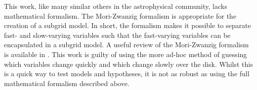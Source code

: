 This work, like many similar others in the astrophysical community, lacks mathematical formalism.
The Mori-Zwanzig formalism \citep{ zwanzig_memory_1961, zwanzig_nonequilibrium_2001} is appropriate for the creation of a subgrid model.
In short, the formalism makes it possible to separate fast- and slow-varying variables such that the fast-varying variables can be encapsulated in a subgrid model.
A useful review of the Mori-Zwanzig formalism is available in \citet{xing_mori-zwanzig_2009}.
This work is guilty of using the more ad-hoc method of guessing which variables change quickly and which change slowly over the disk.
Whilst this is a quick way to test models and hypotheses, it is not as robust as using the full mathematical formalism described above.
